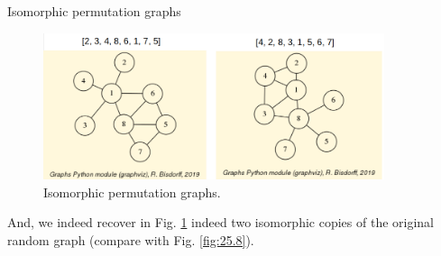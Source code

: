     Isomorphic permutation graphs
\begin{figure}[h]
\includegraphics[width=10cm]{Figures/isomorphicPerms.png}
\caption{Isomorphic permutation graphs.} 
\label{fig:25.11}       %
\end{figure}

And, we indeed recover in Fig. \ref{fig:25.11} indeed two isomorphic copies of the original random graph (compare with Fig. \ref{fig:25.8}).
 
\clearpage


%